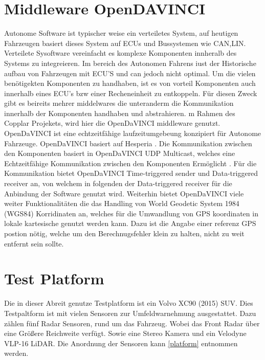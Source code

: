 \section{Middleware OpenDAVINCI}
Autonome Software ist typischer weise ein verteiletes System, auf heutigen Fahrzeugen basiert dieses System auf ECUs und Bussystemen wie CAN,LIN.
Verteilete Sysoftware vereinfacht es komplexe Komponenten innheralb des Systems zu integreieren. Im bereich des Autonomen Fahrens iust der Historische aufbau von Fahrzeugen
mit ECU'S und can jedoch nicht optimal. Um die vielen benötigekten Komponenten zu handhaben, ist es von vorteil Komponenten auch innerhalb eines ECU's bzw einer Recheneinheit
zu entkoppeln. Für diesen Zweck gibt es beireits mehrer middelwares die unteranderm die Kommunikation innerhalb der Komponenten handhaben und abstrahieren.
m Rahmen des Copplar Projekets, wird hier die OpenDaVINCI middleware genutzt. OpenDaVINCI ist eine echtzeitfähige laufzeitumgebeung konzipiert für Autonome Fahrzeuge.
OpenDaVINCI basiert auf Hesperia \cite{Berger2010}. Die Kommunikation zwischen den Komponenten basiert in OpenDaVINCI UDP Multicast, welches eine Echtzeitfähige Kommunikation zwischen
den Komponenten Ermöglicht \cite{Kurose2013}. Für die Kommunikation bietet OpenDaVINCI Time-triggered sender und Data-triggered receiver an, von welchem in folgenden der Data-triggered receiver
für die Anbindung der Software genutzt wird. Weiterhin bietet OpenDaVINCI viele weiter Funktionalitäten die das Handling von World Geodetic System 1984 (WGS84) Korridinaten an, welches für die Umwandlung
von GPS koordinaten in lokale kartesische genutzt werden kann. Dazu ist die Angabe einer referenz GPS postion nötig, welche um den Berechnugsfehler klein zu halten,
nicht zu weit entfernt sein sollte.


\section{Test Platform}
Die in dieser Abreit genutze Testplatform ist ein Volvo XC90 (2015) SUV. Dies Testpaltform ist mit vielen Sensoren zur Umfeldwarnehmung ausgestattet.
Dazu zählen fünf Radar Sensoren, rund um das Fahrzeug. Wobei das Front Radar über eine Größere Reichweite verfügt. Sowie eine
Stereo Kamera und ein Velodyne VLP-16 LiDAR. Die Anordnung der Sensoren kann \cref{platform} entnommen werden.


